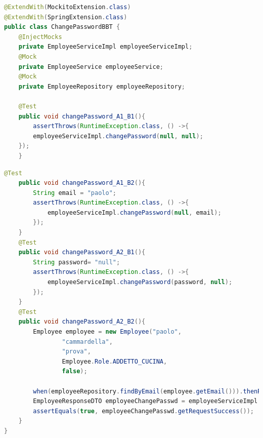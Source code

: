 \begin{lstlisting}[language=java]
@ExtendWith(MockitoExtension.class)
@ExtendWith(SpringExtension.class)
public class ChangePasswordBBT {
    @InjectMocks
    private EmployeeServiceImpl employeeServiceImpl;
    @Mock
    private EmployeeService employeeService;
    @Mock
    private EmployeeRepository employeeRepository;

    @Test
    public void changePassword_A1_B1(){
        assertThrows(RuntimeException.class, () ->{
        employeeServiceImpl.changePassword(null, null);
    });
    }
\end{lstlisting}
\newpage
\begin{lstlisting}[language=java]
    @Test
    public void changePassword_A1_B2(){
        String email = "paolo";
        assertThrows(RuntimeException.class, () ->{
            employeeServiceImpl.changePassword(null, email);
        });
    }
    @Test
    public void changePassword_A2_B1(){
        String password= "null";
        assertThrows(RuntimeException.class, () ->{
            employeeServiceImpl.changePassword(password, null);
        });
    }
    @Test
    public void changePassword_A2_B2(){
        Employee employee = new Employee("paolo",
                "cammardella",
                "prova",
                Employee.Role.ADDETTO_CUCINA,
                false);

        when(employeeRepository.findByEmail(employee.getEmail())).thenReturn(employee);
        EmployeeResponseDTO employeeChangePasswd = employeeServiceImpl.changePassword(employee.getPassword(), employee.getEmail());
        assertEquals(true, employeeChangePasswd.getRequestSuccess());
    }
}
\end{lstlisting}

